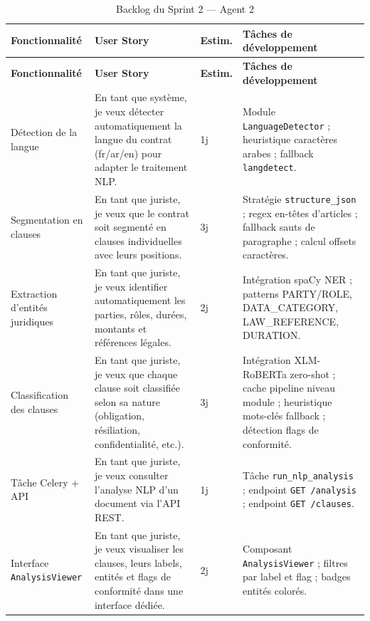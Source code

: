 \renewcommand{\arraystretch}{1.4}
\begin{longtable}{|p{3.0cm}|p{5.8cm}|>{\centering\arraybackslash}p{1.4cm}|p{5.0cm}|}
\caption{Backlog du Sprint 2 — Agent 2}
\label{tab:sprint2_agent2} \\
\hline
\rowcolor[HTML]{D6E4F0}
\textbf{Fonctionnalité} & \textbf{User Story} & \textbf{Estim.} & \textbf{Tâches de développement} \\
\hline
\endfirsthead
\hline
\rowcolor[HTML]{D6E4F0}
\textbf{Fonctionnalité} & \textbf{User Story} & \textbf{Estim.} & \textbf{Tâches de développement} \\
\hline
\endhead
\hline
\endfoot
\hline
\endlastfoot

\rowcolor[HTML]{EBF5FB}
Détection de la langue &
En tant que système, je veux détecter automatiquement la langue du contrat (fr/ar/en) pour adapter le traitement NLP. &
1j &
Module \texttt{LanguageDetector} ; heuristique caractères arabes ; fallback \texttt{langdetect}. \\
\hline

Segmentation en clauses &
En tant que juriste, je veux que le contrat soit segmenté en clauses individuelles avec leurs positions. &
3j &
Stratégie \texttt{structure\_json} ; regex en-têtes d'articles ; fallback sauts de paragraphe ; calcul offsets caractères. \\
\hline

\rowcolor[HTML]{EBF5FB}
Extraction d'entités juridiques &
En tant que juriste, je veux identifier automatiquement les parties, rôles, durées, montants et références légales. &
2j &
Intégration spaCy NER ; patterns PARTY/ROLE, DATA\_CATEGORY, LAW\_REFERENCE, DURATION. \\
\hline

Classification des clauses &
En tant que juriste, je veux que chaque clause soit classifiée selon sa nature (obligation, résiliation, confidentialité, etc.). &
3j &
Intégration XLM-RoBERTa zero-shot ; cache pipeline niveau module ; heuristique mots-clés fallback ; détection flags de conformité. \\
\hline

\rowcolor[HTML]{EBF5FB}
Tâche Celery + API &
En tant que juriste, je veux consulter l'analyse NLP d'un document via l'API REST. &
1j &
Tâche \texttt{run\_nlp\_analysis} ; endpoint \texttt{GET /analysis} ; endpoint \texttt{GET /clauses}. \\
\hline

Interface \texttt{AnalysisViewer} &
En tant que juriste, je veux visualiser les clauses, leurs labels, entités et flags de conformité dans une interface dédiée. &
2j &
Composant \texttt{AnalysisViewer} ; filtres par label et flag ; badges entités colorés. \\
\hline

\end{longtable}
\renewcommand{\arraystretch}{1.3}

